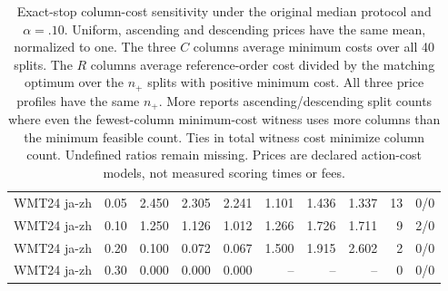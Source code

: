 \begin{table}[t]
\begin{tabular}{lrrrrrrrrr}
WMT24 ja-zh & 0.05 & 2.450 & 2.305 & 2.241 & 1.101 & 1.436 & 1.337 & 13 & 0/0 \\
WMT24 ja-zh & 0.10 & 1.250 & 1.126 & 1.012 & 1.266 & 1.726 & 1.711 & 9 & 2/0 \\
WMT24 ja-zh & 0.20 & 0.100 & 0.072 & 0.067 & 1.500 & 1.915 & 2.602 & 2 & 0/0 \\
WMT24 ja-zh & 0.30 & 0.000 & 0.000 & 0.000 & -- & -- & -- & 0 & 0/0 \\
\bottomrule
\end{tabular}
\caption{Exact-stop column-cost sensitivity under the original median protocol and $\alpha=.10$. Uniform, ascending and descending prices have the same mean, normalized to one. The three $C$ columns average minimum costs over all 40 splits. The $R$ columns average reference-order cost divided by the matching optimum over the $n_+$ splits with positive minimum cost. All three price profiles have the same $n_+$. More reports ascending/descending split counts where even the fewest-column minimum-cost witness uses more columns than the minimum feasible count. Ties in total witness cost minimize column count. Undefined ratios remain missing. Prices are declared action-cost models, not measured scoring times or fees.}
\label{tab:column-cost-exact}
\end{table}
